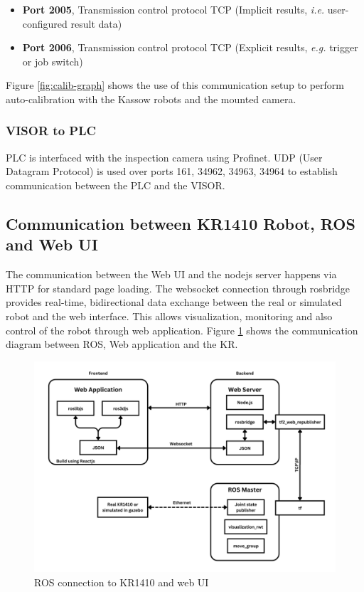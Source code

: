 \begin{itemize}
  \item \textbf{Port 2005}, Transmission control protocol TCP (Implicit results, \textit{i.e.} user-configured result data)
  \item \textbf{Port 2006}, Transmission control protocol TCP (Explicit results, \textit{e.g.} trigger or job switch)
\end{itemize}

Figure \ref{fig:calib-graph} shows the use of this communication setup to perform auto-calibration with the Kassow robots and the mounted camera.

\subsubsection{VISOR to PLC}
PLC is interfaced with the inspection camera using Profinet.
UDP (User Datagram Protocol) is used over ports 161, 34962, 34963, 34964 to establish communication between the PLC and the VISOR. \cite{visor_communication_manual}


\subsection{Communication between KR1410 Robot, ROS and Web UI}
\label{subsec:KR1410ROS}

The communication between the Web UI and the nodejs server happens via HTTP for standard page loading. The websocket connection through rosbridge provides real-time, bidirectional data exchange between the real or simulated robot and the web interface. This allows visualization, monitoring
and also control of the robot through web application. Figure \ref{fig:ros-web-graph} shows the communication diagram between ROS, Web application and the KR.

\begin{figure}[h]
  \centering
  \includegraphics[width=1\textwidth]{figures/ros-web-graph.png}
  \caption{ROS connection to KR1410 and web UI}
  \label{fig:ros-web-graph}
\end{figure}

